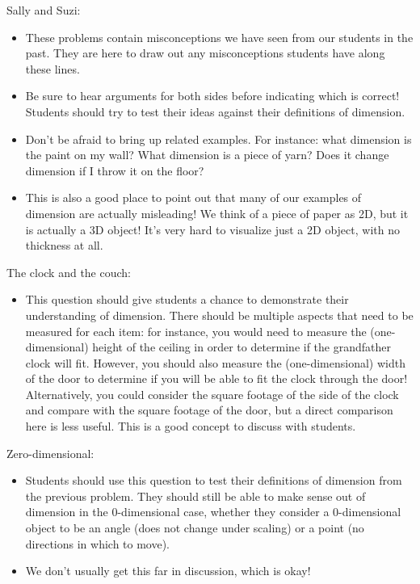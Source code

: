 \documentclass[nooutcomes,noauthor, handout]{ximera}
\begin{document}
\begin{instructorNotes}
    
    Sally and Suzi:
    \begin{itemize}
    	\item These problems contain misconceptions we have seen from our students in the past. They are here to draw out any misconceptions students have along these lines.
	\item Be sure to hear arguments for both sides before indicating which is correct! Students should try to test their ideas against their definitions of dimension.
	\item Don't be afraid to bring up related examples. For instance: what dimension is the paint on my wall? What dimension is a piece of yarn? Does it change dimension if I throw it on the floor?
	\item This is also a good place to point out that many of our examples of dimension are actually misleading! We think of a piece of paper as 2D, but it is actually a 3D object! It's very hard to visualize just a 2D object, with no thickness at all.
    \end{itemize}
    
    The clock and the couch:
    \begin{itemize}
\item This question should give students a chance to demonstrate their understanding of dimension.  There should be multiple aspects that need to be measured for each item: for instance, you would need to measure the (one-dimensional) height of the ceiling in order to determine if the grandfather clock will fit.  However, you should also measure the (one-dimensional) width of the door to determine if you will be able to fit the clock through the door!  Alternatively, you could consider the square footage of the side of the clock and compare with the square footage of the door, but a direct comparison here is less useful.  This is a good concept to discuss with students.
\end{itemize}

Zero-dimensional:
    \begin{itemize}
        \item Students should use this question to test their definitions of dimension from the previous problem.  They should still be able to make sense out of dimension in the 0-dimensional case, whether they consider a 0-dimensional object to be an angle (does not change under scaling) or a point (no directions in which to move).
        \item We don't usually get this far in discussion, which is okay!
    \end{itemize}





\end{instructorNotes}
\end{document}
